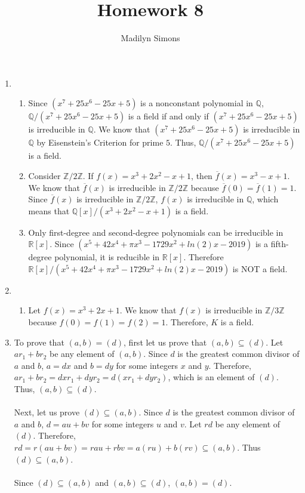\documentclass{article}
\title{Homework 8}
\author{Madilyn Simons}
\date{}
\begin{document}
\maketitle

\begin{enumerate}

\item
\begin{enumerate}

\item Since $(x^7 + 25x^6 - 25x + 5)$ is a nonconstant polynomial in
$\mathbb{Q}$, $\mathbb{Q}/(x^7 + 25x^6 - 25x + 5)$ is a field if and only if
$(x^7 + 25x^6 - 25x + 5)$ is irreducible in $\mathbb{Q}$.  We know that
$(x^7 + 25x^6 - 25x + 5)$ is irreducible in $\mathbb{Q}$ by Eisenstein's
Criterion for prime $5$.  Thus, $\mathbb{Q}/(x^7 + 25x^6 - 25x + 5)$ is a field.

\item Consider $\mathbb{Z}/2\mathbb{Z}$.  If $f(x) = x^3 + 2x^2 - x + 1$, then
$\overline{f}(x) = x^3 - x + 1$.  We know that $\overline{f}(x)$ is
irreducible in $\mathbb{Z}/2\mathbb{Z}$ because
$\overline{f}(0) = \overline{f}(1) = 1$.  Since $\overline{f}(x)$ is
irreducible in $\mathbb{Z}/2\mathbb{Z}$, $f(x)$ is irreducible in $\mathbb{Q}$,
which means that $\mathbb{Q}[x]/(x^3 + 2x^2 - x + 1)$ is a field.

\item Only first-degree and second-degree polynomials can be irreducible in
$\mathbb{R}[x]$.  Since $(x^5 + 42x^4 + \pi x^3 -1729x^2 + ln(2)x - 2019)$
is a fifth-degree polynomial, it is reducible in $\mathbb{R}[x]$.  Therefore
$\mathbb{R}[x]/(x^5 + 42x^4 + \pi x^3 -1729x^2 + ln(2)x - 2019)$ is NOT
a field.

\end{enumerate}

\item
\begin{enumerate}
\item
Let $f(x) = x^3 + 2x + 1$.  We know that $f(x)$ is irreducible in
$\mathbb{Z}/3\mathbb{Z}$ because $f(0) = f(1) = f(2) = 1$.  Therefore,
$K$ is a field.

\end{enumerate}

\item To prove that $(a,b) = (d)$, first let us prove that $(a,b) \subseteq (d)$.
Let $ar_1 + br_2$ be any element of $(a,b)$.  Since $d$ is the greatest common
divisor of $a$ and $b$, $a = dx$ and $b = dy$ for some integers $x$ and $y$.
Therefore, $ar_1 + br_2 = dxr_1 + dyr_2 = d(xr_{1} + dyr_{2})$, which is an
element of $(d)$.  Thus, $(a,b) \subseteq (d)$. \\ \\
Next, let us prove $(d) \subseteq (a,b)$.  Since $d$ is the greatest common
divisor of $a$ and $b$, $d = au + bv$ for some integers $u$ and $v$.  Let
$rd$ be any element of $(d)$.
Therefore, $rd = r(au + bv) = rau + rbv = a(ru) + b(rv) \subseteq (a,b)$.
Thus $(d) \subseteq (a,b)$. \\ \\
Since $(d) \subseteq (a,b)$ and $(a,b) \subseteq (d)$, $(a,b) = (d)$.


\end{enumerate}
\end{document}
